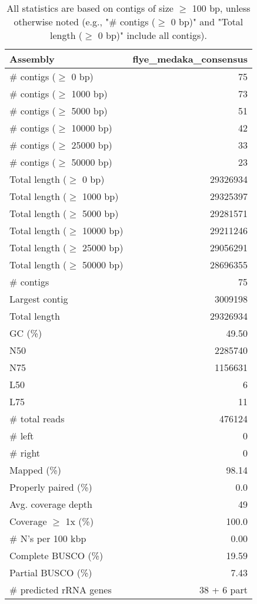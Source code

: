 \documentclass[12pt,a4paper]{article}
\begin{document}
\begin{table}[ht]
\begin{center}
\caption{All statistics are based on contigs of size $\geq$ 100 bp, unless otherwise noted (e.g., "\# contigs ($\geq$ 0 bp)" and "Total length ($\geq$ 0 bp)" include all contigs).}
\begin{tabular}{|l*{1}{|r}|}
\hline
Assembly & flye\_medaka\_consensus \\ \hline
\# contigs ($\geq$ 0 bp) & 75 \\ \hline
\# contigs ($\geq$ 1000 bp) & 73 \\ \hline
\# contigs ($\geq$ 5000 bp) & 51 \\ \hline
\# contigs ($\geq$ 10000 bp) & 42 \\ \hline
\# contigs ($\geq$ 25000 bp) & 33 \\ \hline
\# contigs ($\geq$ 50000 bp) & 23 \\ \hline
Total length ($\geq$ 0 bp) & 29326934 \\ \hline
Total length ($\geq$ 1000 bp) & 29325397 \\ \hline
Total length ($\geq$ 5000 bp) & 29281571 \\ \hline
Total length ($\geq$ 10000 bp) & 29211246 \\ \hline
Total length ($\geq$ 25000 bp) & 29056291 \\ \hline
Total length ($\geq$ 50000 bp) & 28696355 \\ \hline
\# contigs & 75 \\ \hline
Largest contig & 3009198 \\ \hline
Total length & 29326934 \\ \hline
GC (\%) & 49.50 \\ \hline
N50 & 2285740 \\ \hline
N75 & 1156631 \\ \hline
L50 & 6 \\ \hline
L75 & 11 \\ \hline
\# total reads & 476124 \\ \hline
\# left & 0 \\ \hline
\# right & 0 \\ \hline
Mapped (\%) & 98.14 \\ \hline
Properly paired (\%) & 0.0 \\ \hline
Avg. coverage depth & 49 \\ \hline
Coverage $\geq$ 1x (\%) & 100.0 \\ \hline
\# N's per 100 kbp & 0.00 \\ \hline
Complete BUSCO (\%) & 19.59 \\ \hline
Partial BUSCO (\%) & 7.43 \\ \hline
\# predicted rRNA genes & 38 + 6 part \\ \hline
\end{tabular}
\end{center}
\end{table}
\end{document}
